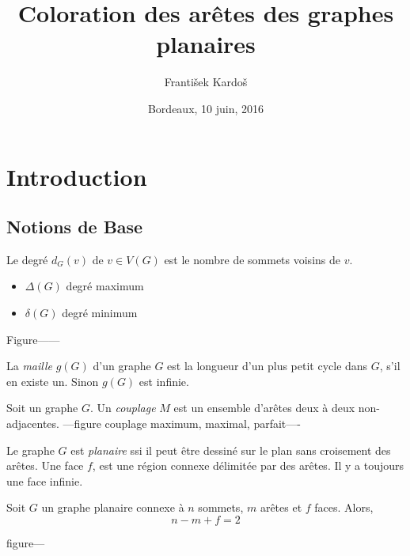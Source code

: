 \documentclass{beamer}
\title[Coloration des arêtes des graphes planaires]{Coloration des arêtes des graphes planaires}
\author[A. Gallastegui and F. Kardo\v s]{\underbar{Antonio Gallastegui} \and Franti\v sek Kardo\v s}
\institute[]{
Laboratoire Bordelais de Recherche Informatique \\
Université de Bordeaux\\
}
\date{Bordeaux, 10 juin, 2016}
\begin{document}
\begin{frame}
  \titlepage
\end{frame}
\section{Introduction}
\subsection{Notions de Base}
\begin{frame}
Le degré $d_G(v)$ de $v\in V(G)$ est le nombre de sommets voisins de $v$.
\begin{itemize}
\item $\Delta(G)$ degré maximum
\item $\delta(G)$ degré minimum
\end{itemize} 
Figure------



La \emph{maille} $g(G)$ d'un graphe $G$ est la longueur d'un plus petit cycle dans $G$, s'il en existe un. Sinon $g(G)$ est infinie.
\end{frame}

\begin{frame}
Soit un graphe $G$. Un \emph{couplage} $M$ est un ensemble d'arêtes deux à deux non-adjacentes.
---figure couplage maximum, maximal, parfait----


\end{frame}

\begin{frame}
Le graphe $G$ est \emph{planaire} ssi il peut être dessiné sur le plan sans croisement des arêtes.
Une face $f$, est une région connexe délimitée par des arêtes. Il y a toujours une face infinie.
\pause
\begin{theorem}[Euler, 1750]
Soit $G$ un graphe planaire connexe à $n$ sommets, $m$ arêtes et $f$ faces. Alors,
$$
n-m+f=2
$$
\end{theorem}
figure---
\end{frame}
\end{document}
